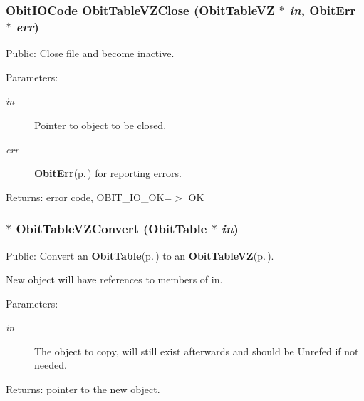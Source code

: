 \subsubsection{\setlength{\rightskip}{0pt plus 5cm}Obit\-IOCode Obit\-Table\-VZClose ({\bf Obit\-Table\-VZ} $\ast$ {\em in}, {\bf Obit\-Err} $\ast$ {\em err})}\label{ObitTableVZ_8c_a25}


Public: Close file and become inactive. 

\begin{Desc}
\item[Parameters:]
\begin{description}
\item[{\em in}]Pointer to object to be closed. \item[{\em err}]{\bf Obit\-Err}{\rm (p.\,\pageref{structObitErr})} for reporting errors. \end{description}
\end{Desc}
\begin{Desc}
\item[Returns:]error code, OBIT\_\-IO\_\-OK=$>$ OK \end{Desc}
\subsubsection{$\ast$ Obit\-Table\-VZConvert ({\bf Obit\-Table} $\ast$ {\em in})}\label{ObitTableVZ_8c_a19}


Public: Convert an {\bf Obit\-Table}{\rm (p.\,\pageref{structObitTable})} to an {\bf Obit\-Table\-VZ}{\rm (p.\,\pageref{structObitTableVZ})}. 

New object will have references to members of in. \begin{Desc}
\item[Parameters:]
\begin{description}
\item[{\em in}]The object to copy, will still exist afterwards and should be Unrefed if not needed. \end{description}
\end{Desc}
\begin{Desc}
\item[Returns:]pointer to the new object. \end{Desc}
